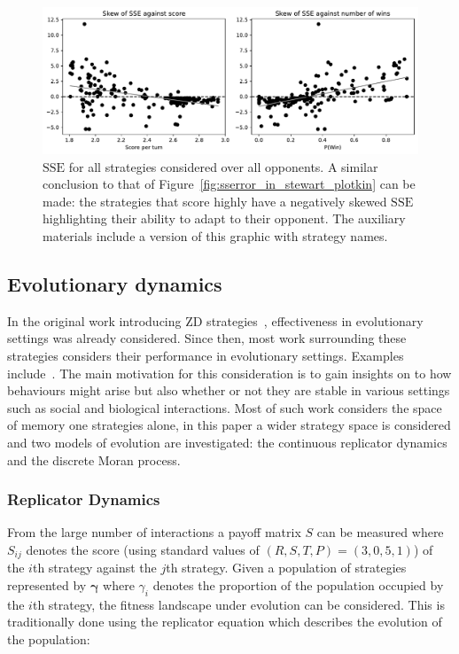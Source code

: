 \documentclass[a4paper]{article}
\newcommand{\SSe}{\text{SSE}}
\begin{document}
\begin{figure}[!htbp]
    \centering
    \includegraphics[width=\textwidth]{./assets/img/sserror_in_std/main.pdf}
    \caption{\(\SSe\) for all strategies considered over all opponents.
        A similar conclusion to that of
        Figure~\ref{fig:sserror_in_stewart_plotkin} can be made: the strategies
        that score highly have a negatively skewed \(\SSe\) highlighting their
        ability to adapt to their opponent. The auxiliary materials include a
        version of this graphic with strategy names.}
        \label{fig:sserror_in_std}
\end{figure}

\subsection{Evolutionary dynamics}\label{sec:evolutionary-dynamics}

In the original work introducing ZD strategies~\cite{Press2012}, effectiveness
in evolutionary settings was already considered. Since then, most work
surrounding these strategies considers their performance in evolutionary
settings. Examples include~\cite{adami2013evolutionary, hilbe2018partners,
Hilbe2013, hilbe2013adaptive, hilbe2015partners, ichinose2018zero, Moran1707}.
The main motivation for this consideration is to gain insights on to how
behaviours might arise but also whether or not they are stable in various
settings such as social and biological interactions. Most of such work
considers the space of memory one strategies alone, in this paper a wider
strategy space is considered and two models of evolution are investigated: the
continuous replicator dynamics and the discrete Moran process.

\subsubsection{Replicator Dynamics}

From the large number of interactions a payoff matrix \(S\) can be measured
where \(S_{ij}\) denotes the score (using standard values of \((R, S, T, P) =
(3, 0, 5, 1)\)) of the \(i\)th strategy against the \(j\)th strategy. Given a
population of strategies represented by \(\boldsymbol{\gamma}\) where \(\gamma_i\)
denotes the proportion of the population occupied by the \(i\)th strategy, the
fitness landscape under evolution can be considered. This is traditionally done
using the replicator equation which describes the evolution of the population:
\end{document}
